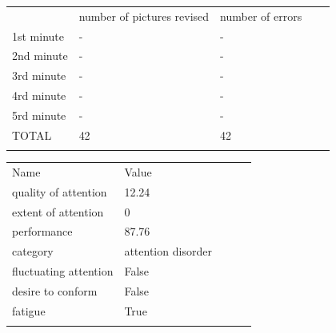 \documentclass[letterpaper, 11pt]{article}
\numberwithin{equation}{section}
\begin{document}
\thispagestyle{firststyle}
\insertidentifiers


\begin{tabular}{lllll}
\cline{1-3}
\multicolumn{1}{|l|}{} & \multicolumn{1}{l|}{number of pictures revised} & \multicolumn{1}{l|}{number of errors} &  &  \\ \cline{1-3}
\multicolumn{1}{|l|}{1st minute} & \multicolumn{1}{l|}{-} & \multicolumn{1}{l|}{-} &  &  \\ \cline{1-3}
\multicolumn{1}{|l|}{2nd minute} & \multicolumn{1}{l|}{-} & \multicolumn{1}{l|}{-} &  &  \\ \cline{1-3}
\multicolumn{1}{|l|}{3rd minute} & \multicolumn{1}{l|}{-} & \multicolumn{1}{l|}{-} &  &  \\ \cline{1-3}
\multicolumn{1}{|l|}{4rd minute} & \multicolumn{1}{l|}{-} & \multicolumn{1}{l|}{-} &  &  \\ \cline{1-3}
\multicolumn{1}{|l|}{5rd minute} & \multicolumn{1}{l|}{-} & \multicolumn{1}{l|}{-} &  &  \\ \cline{1-3}
\multicolumn{1}{|l|}{TOTAL} & \multicolumn{1}{l|}{42} & \multicolumn{1}{l|}{42} &  &  \\ \cline{1-3}
                       &                       &                       &  & 
\end{tabular}



\begin{tabular}{lllll}
\cline{1-2}
\multicolumn{1}{|l|}{Name} & \multicolumn{1}{l|}{Value} &  &  \\ \cline{1-2}
\multicolumn{1}{|l|}{quality of attention}  & \multicolumn{1}{l|}{12.24} &  &  \\ \cline{1-2}
\multicolumn{1}{|l|}{extent of attention}  & \multicolumn{1}{l|}{0} &  &  \\ \cline{1-2}
\multicolumn{1}{|l|}{performance}  & \multicolumn{1}{l|}{87.76} &  &  \\ \cline{1-2}
\multicolumn{1}{|l|}{category}  & \multicolumn{1}{l|}{ attention disorder} &  &  \\ \cline{1-2}
\multicolumn{1}{|l|}{fluctuating attention}  & \multicolumn{1}{l|}{ False} &  &  \\ \cline{1-2}
\multicolumn{1}{|l|}{desire to conform}  & \multicolumn{1}{l|}{False} &  &  \\ \cline{1-2}
\multicolumn{1}{|l|}{fatigue}  & \multicolumn{1}{l|}{True} &  &  \\ \cline{1-2}

                       &                       &                       &  & 
\end{tabular}
\end{document}
